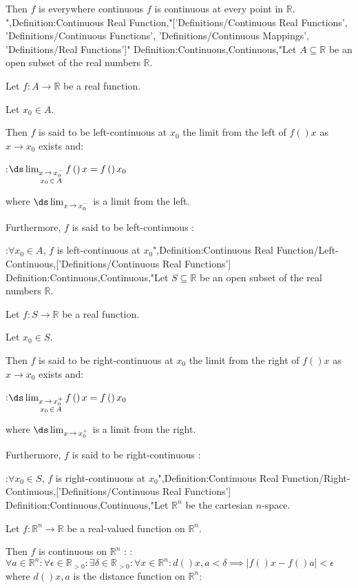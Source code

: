Then $f$ is everywhere continuous  $f$ is continuous at every point in $\mathbb R$.
",Definition:Continuous Real Function,"['Definitions/Continuous Real Functions', 'Definitions/Continuous Functions', 'Definitions/Continuous Mappings', 'Definitions/Real Functions']"
Definition:Continuous,Continuous,"Let $A \subseteq \mathbb R$ be an open subset of the real numbers $\mathbb R$.

Let $f: A \to \mathbb R$ be a real function.


Let $x_0 \in A$. 

Then $f$ is said to be left-continuous at $x_0$  the limit from the left of $f \left(   \right)x$ as $x \to x_0$ exists and:

:$\ds \lim_{\substack {x \mathop \to x_0^- \\ x_0 \mathop \in A} } f \left(   \right)x = f \left(   \right){x_0}$

where $\ds \lim_{x \mathop \to x_0^-}$ is a limit from the left.


Furthermore, $f$ is said to be left-continuous :

:$\forall x_0 \in A$, $f$ is left-continuous at $x_0$",Definition:Continuous Real Function/Left-Continuous,['Definitions/Continuous Real Functions']
Definition:Continuous,Continuous,"Let $S \subseteq \mathbb R$ be an open subset of the real numbers $\mathbb R$.

Let $f: S \to \mathbb R$ be a real function.


Let $x_0 \in S$. 

Then $f$ is said to be right-continuous at $x_0$  the limit from the right of $f \left(   \right)x$ as $x \to x_0$ exists and:

:$\ds \lim_{\substack {x \mathop \to x_0^+ \\ x_0 \mathop \in A}} f \left(   \right)x = f \left(   \right){x_0}$

where $\ds \lim_{x \mathop \to x_0^+}$ is a limit from the right.


Furthermore, $f$ is said to be right-continuous :

:$\forall x_0 \in S$, $f$ is right-continuous at $x_0$",Definition:Continuous Real Function/Right-Continuous,['Definitions/Continuous Real Functions']
Definition:Continuous,Continuous,"Let $\mathbb R^n$ be the cartesian $n$-space.

Let $f: \mathbb R^n \to \mathbb R$ be a real-valued function on $\mathbb R^n$.


Then $f$ is continuous on $\mathbb R^n$ :
:$\forall a \in \mathbb R^n: \forall \epsilon \in \mathbb R_{>0}: \exists \delta \in \mathbb R_{>0}: \forall x \in \mathbb R^n: d \left(   \right){x, a} < \delta \implies \left\lvert f \left(   \right)x - f \left(   \right)a \right\rvert < \epsilon$
where $d \left(   \right){x, a}$ is the distance function on $\mathbb R^n$:

